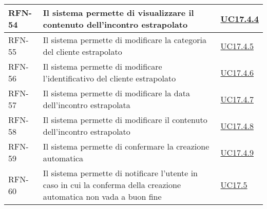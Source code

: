 \begin{table}
\begin{tabularx}{\textwidth}{lXl}
    \hline
    RFN-54 \label{RFN-54} & Il sistema permette di visualizzare il contenuto dell'incontro estrapolato & \hyperref[UC17.4.4]{UC17.4.4} \\
    \hline
    RFN-55 \label{RFN-55} & Il sistema permette di modificare la categoria del cliente estrapolato & \hyperref[UC17.4.5]{UC17.4.5} \\
    \hline
    RFN-56 \label{RFN-56} & Il sistema permette di modificare l'identificativo del cliente estrapolato & \hyperref[UC17.4.6]{UC17.4.6} \\
    \hline
    RFN-57 \label{RFN-57} & Il sistema permette di modificare la data dell'incontro estrapolata & \hyperref[UC17.4.7]{UC17.4.7} \\
    \hline
    RFN-58 \label{RFN-58} & Il sistema permette di modificare il contenuto dell'incontro estrapolato & \hyperref[UC17.4.8]{UC17.4.8} \\
    \hline
    RFN-59 \label{RFN-59} & Il sistema permette di confermare la creazione automatica & \hyperref[UC17.4.9]{UC17.4.9} \\
    \hline
    RFN-60 \label{RFN-60} & Il sistema permette di notificare l'utente in caso in cui la conferma della creazione automatica non vada a buon fine & \hyperref[UC17.5]{UC17.5} \\
    \hline
\end{tabularx}
\end{table}

\clearpage


